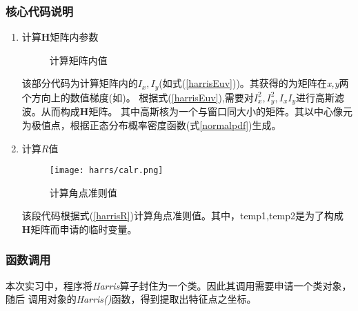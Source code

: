     \subsubsection{核心代码说明}
        \begin{enumerate}
            \item 计算$\bm{H}$矩阵内参数
            
            \begin{figure}[H]
                \centering
                \caption{计算矩阵内值}
                \label{calHcode}
            \end{figure}

            该部分代码为计算矩阵内的$I_x,I_y$(如式(\ref{harrisEuv}))。其获得的为矩阵在\textit{x,y}两个方向上的数值梯度(如)。
            根据式(\ref{harrisEuv}),需要对$I_x^2, I_y^2 , I_x I_y$进行高斯滤波。从而构成$\bm{H}$矩阵。
            其中高斯核为一个与窗口同大小的矩阵。其以中心像元为极值点，根据正态分布概率密度函数(式\ref{normalpdf})生成。

            \item 计算$R$值
            \begin{figure}[H]
                \centering 
                \texttt{[image: harrs/calr.png]}
                \caption{计算角点准则值}
                \label{calharrisR}
            \end{figure}
            该段代码根据式(\ref{harrisR})计算角点准则值。其中，temp1,temp2是为了构成
            $\bm{H}$矩阵而申请的临时变量。

        \end{enumerate}


    \subsubsection{函数调用}
        本次实习中，程序将\textit{Harris}算子封住为一个类。因此其调用需要申请一个类对象，随后
        调用对象的\textit{Harris()}函数，得到提取出特征点之坐标。

